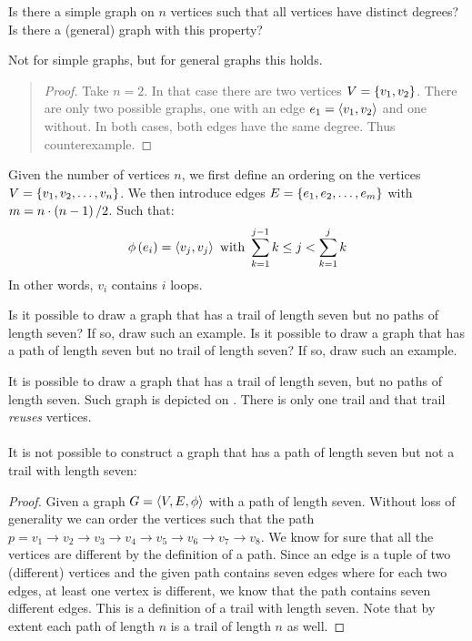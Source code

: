\documentclass{article}
\begin{document}
\begin{exercise}
Is there a simple graph on $n$ vertices such that all vertices have distinct degrees? Is there a (general) graph with this property?
\begin{answer}
Not for simple graphs, but for general graphs this holds.
\begin{quote}\begin{proof}
Take $n=2$. In that case there are two vertices $V=\left\{ v_1,v_2 \right\}$. There are only two possible graphs, one with an edge $e_1=\left\langle v_1,v_2 \right\rangle$ and one without. In both cases, both edges have the same degree. Thus counterexample.
\end{proof}\end{quote}
\begin{construction}
Given the number of vertices $n$, we first define an ordering on the vertices $V=\left\{ v_1,v_2,\ldots,v_n \right\}$. We then introduce edges $E=\left\{ e_1,e_2,\ldots,e_m \right\}$ with $m=n\cdot\left( n-1 \right)/2$. Such that:
\begin{equation}
\phi\left( e_i \right)=\left\langle v_j,v_j \right\rangle\mbox{ with }\displaystyle\sum_{k=1}^{j-1}{k}\leq j<\displaystyle\sum_{k=1}^{j}{k}
\end{equation}
In other words, $v_i$ contains $i$ loops.
\end{construction}
\end{answer}
\end{exercise}

\begin{exercise}
Is it possible to draw a graph that has a trail of length seven but no paths of length seven? If so, draw such an example. Is it possible to draw a graph that has a path of length seven but no trail of length seven? If so, draw such an example.
\begin{answer}
It is possible to draw a graph that has a trail of length seven, but no paths of length seven. Such graph is depicted on . There is only one trail and that trail \emph{reuses} vertices.
\paragraph{}
It is not possible to construct a graph that has a path of length seven but not a trail with length seven:
\begin{proof}
Given a graph $G=\left\langle V,E,\phi \right\rangle$ with a path of length seven. Without loss of generality we can order the vertices such that the path $p=v_1\rightarrow v_2\rightarrow v_3\rightarrow v_4\rightarrow v_5\rightarrow v_6\rightarrow v_7\rightarrow v_8$. We know for sure that all the vertices are different by the definition of a path. Since an edge is a tuple of two (different) vertices and the given path contains seven edges where for each two edges, at least one vertex is different, we know that the path contains seven different edges. This is a definition of a trail with length seven. Note that by extent each path of length $n$ is a trail of length $n$ as well.
\end{proof}
\end{answer}
\end{exercise}
\end{document}
